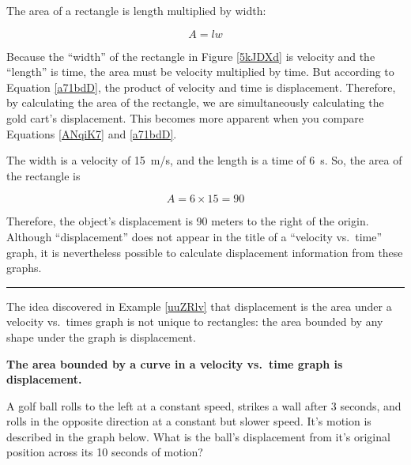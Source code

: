 \documentclass{article}
\begin{document}
The area of a rectangle is length multiplied by width:

\begin{equation} \label{ANqiK7}
    A = l w
\end{equation}

Because the ``width'' of the rectangle in Figure \ref{5kJDXd} is velocity and the ``length'' is time, the area must be velocity multiplied by time. But according to Equation \eqref{a71bdD}, the product of velocity and time is displacement. Therefore, by calculating the area of the rectangle, we are simultaneously calculating the gold cart's displacement. This becomes more apparent when you compare Equations \eqref{ANqiK7} and \eqref{a71bdD}.

\vspace{1em}

The width is a velocity of \SI{15}{m/s}, and the length is a time of \SI{6}{s}. So, the area of the rectangle is 

\begin{equation*}
    A = 6 \times 15 = 90
\end{equation*}

Therefore, the object's displacement is 90 meters to the right of the origin. Although ``displacement'' does not appear in the title of a ``velocity vs.~time'' graph, it is nevertheless possible to calculate displacement information from these graphs.

\hrule

The idea discovered in Example \ref{uuZRlv} that displacement is the area under a velocity vs.~times graph is not unique to rectangles: the area bounded by any shape under the graph is displacement.

\begin{mdframed}[backgroundcolor=black!10]
    \centering
    \textbf{The area bounded by a curve in a velocity vs.~time graph is displacement.}
\end{mdframed}

\begin{example} \label{HjmJqM}
    A golf ball rolls to the left at a constant speed, strikes a wall after 3 seconds, and rolls in the opposite direction at a constant but slower speed. It's motion is described in the graph below. What is the ball's displacement from it's original position across its 10 seconds of motion?
\end{example}

\begin{center}
\end{center}
\end{document}
